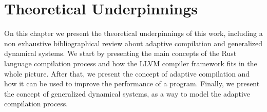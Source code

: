
\chapter{Theoretical Underpinnings}

On this chapter we present the theoretical underpinnings of this work, including a non exhaustive
bibliographical review about adaptive compilation and generalized dynamical systems.
We start by presenting the main concepts of the Rust language compilation process and how the LLVM
compiler framework fits in the whole picture. After that, we present the concept of adaptive compilation
and how it can be used to improve the performance of a program. Finally, we present the concept of
generalized dynamical systems, as a way to model the adaptive compilation process.





